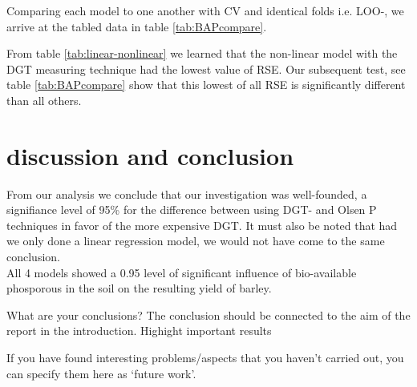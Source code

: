 \documentclass{article}
\begin{document}
Comparing each model to one another with CV and identical folds i.e. LOO-, we arrive at the tabled data in table \ref{tab:BAPcompare}.

From table \ref{tab:linear-nonlinear} we learned that the non-linear model with the DGT measuring technique had the lowest value of RSE. Our subsequent test, see table \ref{tab:BAPcompare} show that this lowest of all RSE is significantly different than all others.



\section{discussion and conclusion}

From our analysis we conclude that our investigation was well-founded, a signifiance level of 95\% for the difference between using DGT- and Olsen P techniques in favor of the more expensive DGT. It  must also be noted that had we only done a linear regression model, we would not have come to the same conclusion. \\ All 4 models showed a 0.95 level of significant influence of bio-available phosporous in the soil on the resulting yield of barley.

What are your conclusions? The conclusion should be connected to the aim of the report in the introduction.
	Highight important results
	
If you have found interesting problems/aspects that you haven’t carried out, you can specify them here as ‘future work’.
\end{document}
